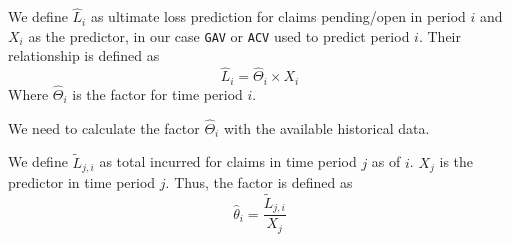 	 
	\begin{Definition}
		We define $\hat{L}_i$ as ultimate loss prediction for claims pending/open in period $i$ and $X_i$ as the predictor, in our case \texttt{GAV} or \texttt{ACV} used to predict period $i$. Their relationship is defined as
		$$\hat{L}_i = \hat{\Theta}_i \times X_i$$
		Where $\hat{\Theta}_i$ is the factor for time period $i$.
	\end{Definition}
	We need to calculate the factor $\hat{\Theta}_i$ with the available historical data. 
	\begin{Definition}
		We define $\widetilde{L}_{j,i}$ as total incurred for claims in time period $j$ as of $i$. $X_j$ is the predictor in time period $j$. Thus, the factor is defined as
		$$\hat{\theta}_i = \frac{\widetilde{L}_{j,i}}{X_j}$$
	\end{Definition}

